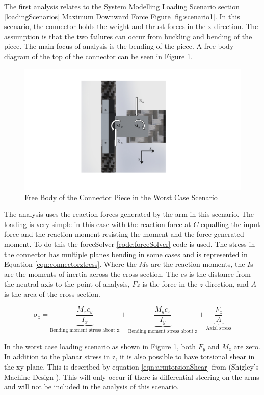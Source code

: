 \documentclass[../main.tex]{subfiles}
\begin{document}
The first analysis relates to the System Modelling Loading Scenario section \ref{loadingScenarios} Maximum Downward Force Figure \ref{fig:scenario1}. In this scenario, the connector holds the weight and thrust forces in the x-direction. The assumption is that the two failures can occur from buckling and bending of the piece. The main focus of analysis is the bending of the piece. A free body diagram of the top of the connector can be seen in Figure \ref{fig:armConnector}. 

\begin{figure}[H]
	\centering
	\includegraphics[page={1}, width=.7\linewidth]{img/analysis/arm/armConnector.pdf}
	\caption{Free Body of the Connector Piece in the Worst Case Scenario}
	\label{fig:armConnector}
\end{figure}

The analysis uses the reaction forces generated by the arm in this scenario. The loading is very simple in this case with the reaction force at $C$ equalling the input force and the reaction moment resisting the moment and the force generated moment. To do this the forceSolver \ref{code:forceSolver} code is used. The stress in the connector has multiple planes bending in some cases and is represented in Equation \ref{eqn:connectorztress}. Where the $M$s are the reaction moments, the $I$s are the moments of inertia across the cross-section. The $c$s is the distance from the neutral axis to the point of analysis, $Fz$ is the force in the $z$ direction, and $A$ is the area of the cross-section.

\begin{equation}
\label{eqn:connectorztress}
\sigma_{z}=  \underbrace{\frac{M_{x}c_y}{I_x}}_\text{Bending moment stress about x} + \underbrace{\frac{M_{y}c_x}{I_y}}_\text{Bending moment stress about z} + \underbrace{\frac{F_z}{A}}_\text{Axial stress} 
\end{equation}

In the worst case loading scenario as shown in Figure \ref{fig:armConnector}, both $F_y$ and $M_z$ are zero. In addition to the planar stress in z, it is also possible to have torsional shear in the xy plane. This is described by equation \ref{eqn:armtorsionShear} from {(Shigley's Machine Design \cite[102]{shigley})}. This will only occur if there is differential steering on the arms and will not be included in the analysis of this scenario.
\end{document}
